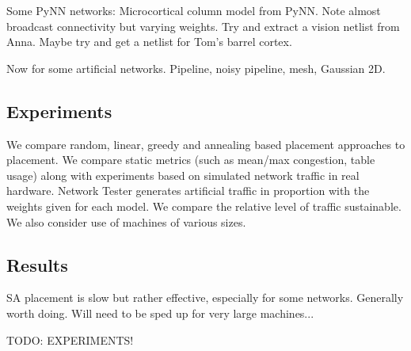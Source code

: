 			Some PyNN networks: Microcortical column model from PyNN. Note almost
			broadcast connectivity but varying weights. Try and extract a vision
			netlist from Anna. Maybe try and get a netlist for Tom's barrel cortex.
			
			Now for some artificial networks. Pipeline, noisy pipeline, mesh,
			Gaussian 2D.
		
		\subsection{Experiments}
			
			We compare random, linear, greedy and annealing based placement
			approaches to placement. We compare static metrics (such as mean/max
			congestion, table usage) along with experiments based on simulated
			network traffic in real hardware. Network Tester generates artificial
			traffic in proportion with the weights given for each model. We compare
			the relative level of traffic sustainable. We also consider use of
			machines of various sizes.
		
		\subsection{Results}
			
			SA placement is slow but rather effective, especially for some networks.
			Generally worth doing. Will need to be sped up for very large machines...
			
			TODO: EXPERIMENTS!
	
